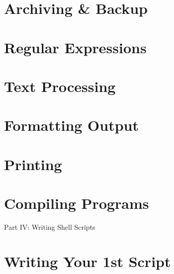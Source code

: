 \documentclass[oneside]{book}
\numberwithin{equation}{section}
\begin{document}

\section{Archiving \& Backup}


\section{Regular Expressions}


\section{Text Processing}


\section{Formatting Output}


\section{Printing}


\section{Compiling Programs}


\begin{center}
	\huge Part IV: Writing Shell Scripts
\end{center}


\section{Writing Your 1st Script}
\end{document}
